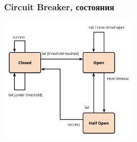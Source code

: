 \documentclass{../../slides-style}
\begin{document}
    \begin{frame}
        \frametitle{Circuit Breaker, состояния}
        \begin{center}
            \includegraphics[width=0.5\textwidth]{circuitBreakerStates.png}
        \end{center}
    \end{frame}
\end{document}
